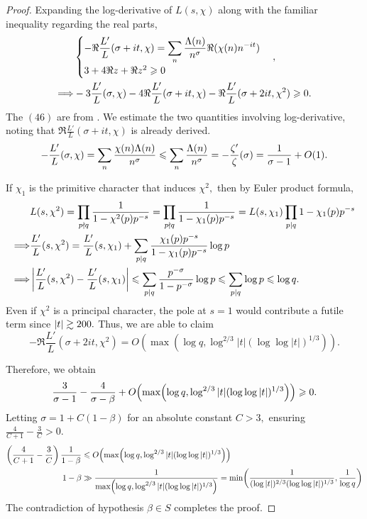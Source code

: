 \begin{proof}
Expanding the log-derivative of $L(s, \chi)$ along with the familiar inequality regarding the real parts,
\begin{align}
    &\begin{cases}
        \displaystyle -\Re \frac{L'}{L}(\sigma + it, \chi) = \sum_{n} \frac{\Lambda(n)}{n^\sigma} \Re(\chi(n) n^{-it}) \\
        3 + 4 \Re z + \Re z^2 \geqslant 0
    \end{cases}, \\
    \Longrightarrow& -3 \frac{L'}{L}(\sigma, \chi) - 4 \Re \frac{L'}{L}(\sigma + it, \chi) - \Re \frac{L'}{L}(\sigma + 2it, \chi^2) \geqslant 0.
\end{align}
The $(46)$ are from \cite[Ch.~14]{Davenport}. We estimate the two quantities involving log-derivative, noting that $\Re \frac{L'}{L}(\sigma + it, \chi)$ is already derived. $$-\frac{L'}{L}(\sigma, \chi) = \sum_{n} \frac{\chi(n)\Lambda(n)}{n^\sigma} \leqslant \sum_{n} \frac{\Lambda(n)}{n^\sigma} = -\frac{\zeta'}{\zeta}(\sigma) = \frac{1}{\sigma - 1} + O(1).$$

If $\chi_1$ is the primitive character that induces $\chi^2,$ then by Euler product formula, 
\begin{align*}
    &L(s, \chi^2) = \prod_{p \nmid q} \frac{1}{1 - \chi^2(p) p^{-s}} = \prod_{p \nmid q} \frac{1}{1 - \chi_1(p) p^{-s}} = L(s,\chi_1) \prod_{p|q} 1 - \chi_1(p)p^{-s} \\
    \Longrightarrow &\frac{L'}{L}(s, \chi^2) = \frac{L'}{L}(s, \chi_1) + \sum_{p|q} \frac{\chi_1(p) p^{-s}}{1 - \chi_1(p) p^{-s}} \log p \\
    \Longrightarrow &\left\lvert \frac{L'}{L}(s, \chi^2) - \frac{L'}{L}(s, \chi_1) \right\rvert \leqslant \sum_{p|q} \frac{p^{-\sigma}}{1 - p^{-\sigma}} \log p \leqslant \sum_{p|q} \log p \leqslant \log q.
\end{align*}
Even if $\chi^2$ is a principal character, the pole at $s = 1$ would contribute a futile term since $\left\lvert t \right\rvert \gtrsim 200.$
Thus, we are able to claim $$-\Re \frac{L'}{L}(\sigma + 2it, \chi^2) = O\! \left( \max\!\left( \log q, \log^{2/3} |t| (\log \log |t|)^{1/3} \right) \right).$$ 

Therefore, we obtain $$\frac{3}{\sigma - 1} - \frac{4}{\sigma - \beta} + O\! \left( \max\!\left( \log q, \log^{2/3} |t| (\log \log |t|)^{1/3} \right) \right) \geqslant 0.$$ Letting $\sigma = 1 + C(1-\beta)$ for an absolute constant $C > 3,$ ensuring $\frac{4}{C+1} - \frac{3}{C} > 0.$
\begin{align*}
    \left( \frac{4}{C+1} - \frac{3}{C} \right) \frac{1}{1-\beta} &\leqslant O\! \left( \max\!\left( \log q, \log^{2/3} |t| (\log \log |t|)^{1/3} \right) \right) \\
    1-\beta &\gg \frac{1}{\max\!\left(\log q, \log^{2/3}|t|(\log\log|t|)^{1/3} \right)} = \min\!\left( \frac{1}{(\log |t|)^{2/3} (\log\log |t|)^{1/3}}, \frac{1}{\log q} \right)
\end{align*}
The contradiction of hypothesis $\beta \in S$ completes the proof.


\end{proof}
